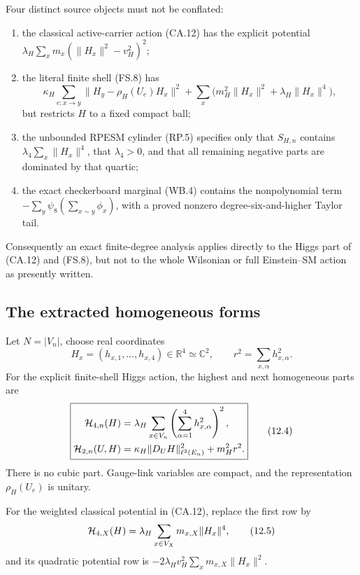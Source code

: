 \documentclass[11pt]{article}
\theoremstyle{remark}
\begin{document}
Four distinct source objects must not be conflated:
\begin{enumerate}
\item the classical active-carrier action \textup{(CA.12)} has the
      explicit potential
      \(\lambda_H\sum_xm_x(\|H_x\|^2-v_H^2)^2\);
\item the literal finite shell \textup{(FS.8)} has
      \[
      \kappa_H\sum_{e:x\to y}
      \|H_y-\rho_H(U_e)H_x\|^2
      +\sum_x\bigl(m_H^2\|H_x\|^2+\lambda_H\|H_x\|^4\bigr),
                                                                  \tag{12.2}
      \]
      but restricts \(H\) to a fixed compact ball;
\item the unbounded RPESM cylinder \textup{(RP.5)} specifies only
      that \(S_{H,n}\) contains
      \(\lambda_4\sum_x\|H_x\|^4\), that \(\lambda_4>0\), and that
      all remaining negative parts are dominated by that quartic;
\item the exact checkerboard marginal \textup{(WB.4)} contains the
      nonpolynomial term
      \(-\sum_y\psi_8(\sum_{x\sim y}\phi_x)\), with a proved
      nonzero degree-six-and-higher Taylor tail.
\end{enumerate}
Consequently an exact finite-degree analysis applies directly to
the Higgs part of \textup{(CA.12)} and \textup{(FS.8)}, but not to
the whole Wilsonian or full Einstein--SM action as presently written.

\subsection{The extracted homogeneous forms}

Let \(N=|V_n|\), choose real coordinates
\[
 H_x=(h_{x,1},\ldots,h_{x,4})\in\mathbb R^4\simeq\mathbb C^2,
 \qquad
 r^2=\sum_{x,\alpha}h_{x,\alpha}^2.                \tag{12.3}
\]
For the explicit finite-shell Higgs action, the highest and next
homogeneous parts are
\[
\boxed{
\begin{aligned}
 {\cal H}_{4,n}(H)
 &=\lambda_H\sum_{x\in V_n}
   \left(\sum_{\alpha=1}^4h_{x,\alpha}^2\right)^2,\\
 {\cal H}_{2,n}(U,H)
 &=\kappa_H\|D_UH\|_{\ell^2(E_n)}^2+m_H^2r^2 .
\end{aligned}}                                                     \tag{12.4}
\]
There is no cubic part.  Gauge-link variables are compact, and the
representation \(\rho_H(U_e)\) is unitary.

For the weighted classical potential in \textup{(CA.12)}, replace
the first row by
\[
 {\cal H}_{4,X}(H)
 =\lambda_H\sum_{x\in V_X}m_{x,X}\|H_x\|^4,        \tag{12.5}
\]
and its quadratic potential row is
\(-2\lambda_Hv_H^2\sum_xm_{x,X}\|H_x\|^2\).
\end{document}
